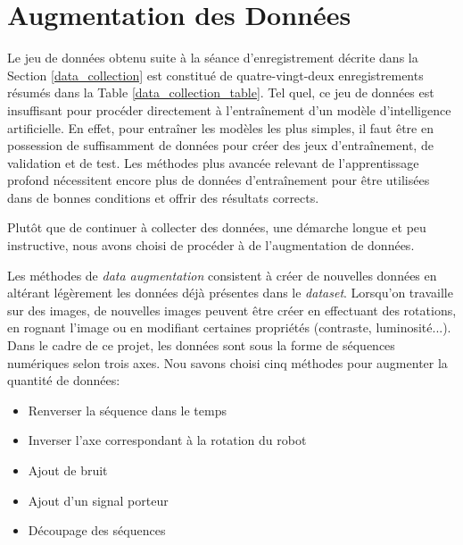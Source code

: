 \section{Augmentation des Données}
Le jeu de données obtenu suite à la séance d'enregistrement décrite dans la Section \ref{data_collection} est constitué de quatre-vingt-deux enregistrements résumés dans la Table \ref{data_collection_table}. Tel quel, ce jeu de données est insuffisant pour procéder directement à l'entraînement d'un modèle d'intelligence artificielle. En effet, pour entraîner les modèles les plus simples, il faut être en possession de suffisamment de données pour créer des jeux d'entraînement, de validation et de test. Les méthodes plus avancée relevant de l'apprentissage profond nécessitent encore plus de données d'entraînement pour être utilisées dans de bonnes conditions et offrir des résultats corrects.

Plutôt que de continuer à collecter des données, une démarche longue et peu instructive, nous avons choisi de procéder à de l'augmentation de données.

Les méthodes de \textit{data augmentation} consistent à créer de nouvelles données en altérant légèrement les données déjà présentes dans le \textit{dataset}. Lorsqu'on travaille sur des images, de nouvelles images peuvent être créer en effectuant des rotations, en rognant l'image ou en modifiant certaines propriétés (contraste, luminosité...).\\
Dans le cadre de ce projet, les données sont sous la forme de séquences numériques selon trois axes. Nou savons choisi cinq méthodes pour augmenter la quantité de données:
\begin{itemize}
    \item Renverser la séquence dans le temps
    \item Inverser l'axe correspondant à la rotation du robot
    \item Ajout de bruit
    \item Ajout d'un signal porteur
    \item Découpage des séquences
\end{itemize}

